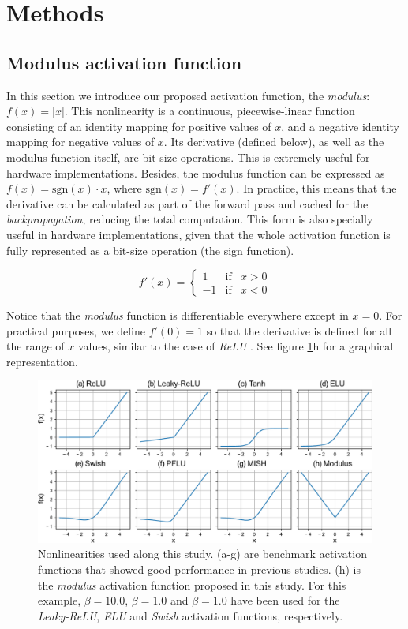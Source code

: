 \documentclass[authoryear]{elsarticle}
\begin{document}

\section{Methods} \label{sec:methods}
\subsection{Modulus activation function}
In this section we introduce our proposed activation function, the \textit{modulus}: $f(x)=|x|$. This nonlinearity is a continuous, piecewise-linear function consisting of an identity mapping for positive values of $x$, and a negative identity mapping for negative values of $x$. Its derivative (defined below), as well as the modulus function itself, are bit-size operations. This is extremely useful for hardware implementations. Besides, the modulus function can be expressed as $f(x) = \text{sgn}(x)\cdot x$, where $\text{sgn}(x) = f'(x)$. In practice, this means that the derivative can be calculated as part of the forward pass and cached for the \textit{backpropagation}, reducing the total computation. This form is also specially useful in hardware implementations, given that the whole activation function is fully represented as a bit-size operation (the sign function).

$$
f'(x)= \left\{ \begin{array}{lcc}
1 &   \text{if}  & x > 0 \\
-1 &  \text{if} & x < 0 
\end{array} \right.
$$

Notice that the \textit{modulus} function is differentiable everywhere except in $x = 0$. For practical purposes, we define $f'(0) = 1$ so that the derivative is defined for all the range of $x$ values, similar to the case of \textit{ReLU} \citep{goodfellow2016}. See figure \ref{fig:activations}h for a graphical representation.


\begin{figure}
	\centering
	\includegraphics[width=1.0\linewidth]{figs/activations}
	\caption{Nonlinearities used along this study. (a-g) are benchmark activation functions that showed good performance in previous studies. (h) is the \textit{modulus} activation function proposed in this study. For this example, $\beta=10.0$, $\beta=1.0$ and $\beta=1.0$ have been used for the \textit{Leaky-ReLU}, \textit{ELU} and \textit{Swish} activation functions, respectively.}
	\label{fig:activations}
\end{figure}
\end{document}
